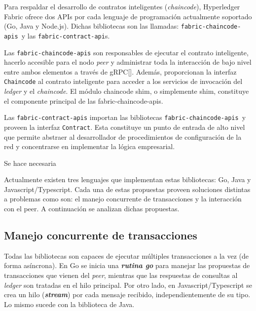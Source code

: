 Para respaldar el desarrollo de contratos inteligentes (\textit{chaincode}), Hyperledger Fabric ofrece dos APIs por cada lenguaje de programación actualmente soportado (Go, Java y Node.js). Dichas bibliotecas son las llamadas: \texttt{fabric-chaincode-apis }y las \texttt{fabric-contract-api}s.

Las \texttt{fabric-chaincode-apis} son responsables de ejecutar el contrato inteligente, hacerlo accesible para el nodo \textit{peer} y administrar toda la interacción de bajo nivel entre ambos elementos a través de gRPC[\cite{grpc-doc}]. Además, proporcionan la interfaz  \texttt{Chaincode} al contrato inteligente para acceder a los servicios de invocación del \textit{ledger} y el \textit{chaincode}. El módulo chaincode shim, o simplemente shim, constituye el componente principal de las fabric-chaincode-apis.

Las \texttt{fabric-contract-apis} importan las bibliotecas \texttt{fabric-chaincode-apis }y  proveen la interfaz \texttt{Contract}. Esta constituye un punto de entrada de alto nivel que permite abstraer al desarrollador de procedimientos de configuración de la red y concentrarse en implementar la lógica empresarial.

Se hace necesaria 
%

Actualmente existen tres lenguajes que implementan estas bibliotecas: Go, Java y Javascript/Typescript. Cada una de estas propuestas proveen soluciones distintas a problemas como son: el manejo concurrente de transacciones y la interacción con el peer. A continuación se analizan dichas propuestas.

\subsection{Manejo concurrente de transacciones}
Todas las bibliotecas son capaces de ejecutar múltiples transacciones a la vez (de forma asíncrona). En Go se inicia una \textit{\textbf{rutina go}} para manejar las propuestas de transacciones que vienen del \textit{peer}, mientras que las respuestas de consultas al \textit{ledger} son tratadas en el hilo principal. Por otro lado, en Javascript/Typescript se crea un hilo (\textit{\textbf{stream}}) por cada mensaje recibido, independientemente de su tipo. Lo mismo sucede con la biblioteca de Java.
